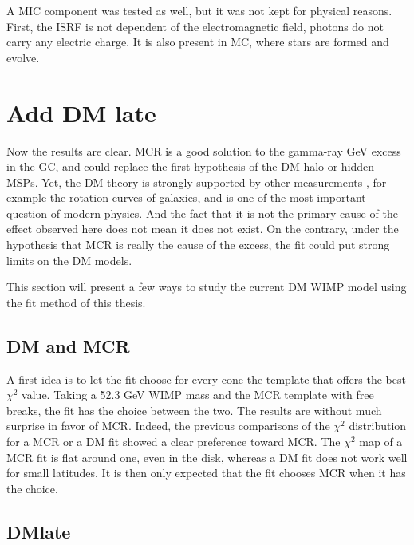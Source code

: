 A MIC component was tested as well, but it was not kept for physical reasons. First, the ISRF is not dependent of the electromagnetic field, photons do not carry any electric charge. It is also present in MC, where stars are formed and evolve.


\section{Add DM late}


Now the results are clear. MCR is a good solution to the gamma-ray GeV excess in the GC, and could replace the first hypothesis of the DM halo or hidden MSPs. Yet, the DM theory is strongly supported by other measurements , for example the rotation curves of galaxies, and is one of the most important question of modern physics. And the fact that it is not the primary cause of the effect observed here does not mean it does not exist. On the contrary, under the hypothesis that MCR is really the cause of the excess, the fit could put strong limits on the DM models.

This section will present a few ways to study the current DM WIMP model using the fit method of this thesis.

\subsection{DM and MCR}

A first idea is to let the fit choose for every cone the template that offers the best $\chi^2$ value. Taking a 52.3 GeV WIMP mass and the MCR template with free breaks, the fit has the choice between the two. The results are without much surprise in favor of MCR. Indeed, the previous comparisons of the $\chi^2$ distribution for a MCR or a DM fit showed a clear preference toward MCR. The $\chi^2$ map of a MCR fit is flat around one, even in the disk, whereas a DM fit does not work well for small latitudes. It is then only expected that the fit chooses MCR when it has the choice.

\subsection{DMlate}

